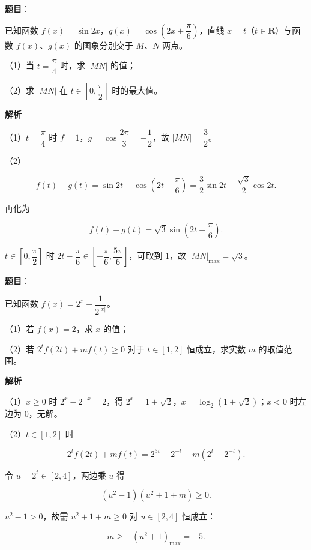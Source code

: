 \begin{answer}

\textbf{题目}：

已知函数 $f(x)=\sin2x$，$g(x)=\cos\left(2x+\dfrac{\pi}6\right)$，直线 $x=t$（$t\in\mathbf R$）与函数 $f(x)$、$g(x)$ 的图象分别交于 $M$、$N$ 两点。

（1）当 $t=\dfrac{\pi}4$ 时，求 $|MN|$ 的值；

（2）求 $|MN|$ 在 $t\in\left[0,\dfrac{\pi}2\right]$ 时的最大值。

\textbf{解析}

（1）$t=\dfrac{\pi}4$ 时 $f=1$，$g=\cos\dfrac{2\pi}3=-\dfrac12$，故 $|MN|=\dfrac32$。

（2）

\nopagebreak[4]
\[f(t)-g(t)=\sin2t-\cos\left(2t+\frac{\pi}6\right)=\frac32\sin2t-\frac{\sqrt3}2\cos2t.\]

再化为

\nopagebreak[4]
\[f(t)-g(t)=\sqrt3\sin\left(2t-\frac{\pi}6\right).\]

$t\in\left[0,\dfrac{\pi}2\right]$ 时 $2t-\dfrac{\pi}6\in\left[-\dfrac{\pi}6,\dfrac{5\pi}6\right]$，可取到 $1$，故 $|MN|_{\max}=\sqrt3$。


\end{answer}
\begin{answer}

\textbf{题目}：

已知函数 $f(x)=2^x-\dfrac1{2^{|x|}}$。

（1）若 $f(x)=2$，求 $x$ 的值；

（2）若 $2^tf(2t)+mf(t)\geqslant0$ 对于 $t\in[1,2]$ 恒成立，求实数 $m$ 的取值范围。

\textbf{解析}

（1）$x\geqslant0$ 时 $2^x-2^{-x}=2$，得 $2^x=1+\sqrt2$，$x=\log_2(1+\sqrt2)$；$x<0$ 时左边为 $0$，无解。

（2）$t\in[1,2]$ 时

\nopagebreak[4]
\[2^tf(2t)+mf(t)=2^{3t}-2^{-t}+m\left(2^t-2^{-t}\right).\]

令 $u=2^t\in[2,4]$，两边乘 $u$ 得

\nopagebreak[4]
\[(u^2-1)(u^2+1+m)\geqslant0.\]

$u^2-1>0$，故需 $u^2+1+m\geqslant0$ 对 $u\in[2,4]$ 恒成立：

\nopagebreak[4]
\[m\geqslant-\left(u^2+1\right)_{\max}=-5.\]


\end{answer}
